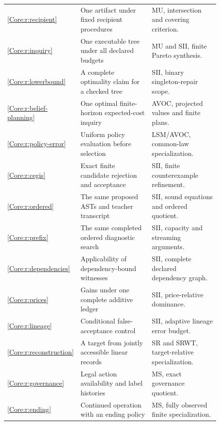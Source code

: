 \documentclass[11pt,oneside,openany]{book}
\numberwithin{equation}{section}
\begin{document}
\begin{longtable}{p{0.13\linewidth}p{0.39\linewidth}p{0.35\linewidth}}
\ref{Core:r:recipient} & One artifact under fixed recipient procedures & MU, intersection and covering criterion.\\
\ref{Core:r:inquiry} & One executable tree under all declared budgets & MU and SII, finite Pareto synthesis.\\
\ref{Core:r:lowerbound} & A complete optimality claim for a checked tree & SII, binary singleton-repair scope.\\
\ref{Core:r:belief-planning} & One optimal finite-horizon expected-cost inquiry & AVOC, projected values and finite plans.\\
\ref{Core:r:policy-error} & Uniform policy evaluation before selection & LSM/AVOC, common-law specialization.\\
\ref{Core:r:cegis} & Exact finite candidate rejection and acceptance & SII, finite counterexample refinement.\\
\ref{Core:r:ordered} & The same proposed ASTs and teacher transcript & SII, sound equations and ordered quotient.\\
\ref{Core:r:prefix} & The same completed ordered diagnostic search & SII, capacity and streaming arguments.\\
\ref{Core:r:dependencies} & Applicability of dependency-bound witnesses & SII, complete declared dependency graph.\\
\ref{Core:r:prices} & Gains under one complete additive ledger & SII, price-relative dominance.\\
\ref{Core:r:lineage} & Conditional false-acceptance control & SII, adaptive lineage error budget.\\
\ref{Core:r:reconstruction} & A target from jointly accessible linear records & SR and SRWT, target-relative specialization.\\
\ref{Core:r:governance} & Legal action availability and label histories & MS, exact governance quotient.\\
\ref{Core:r:ending} & Continued operation with an ending policy & MS, fully observed finite specialization.\\\bottomrule
\end{longtable}
\normalsize
\end{document}
